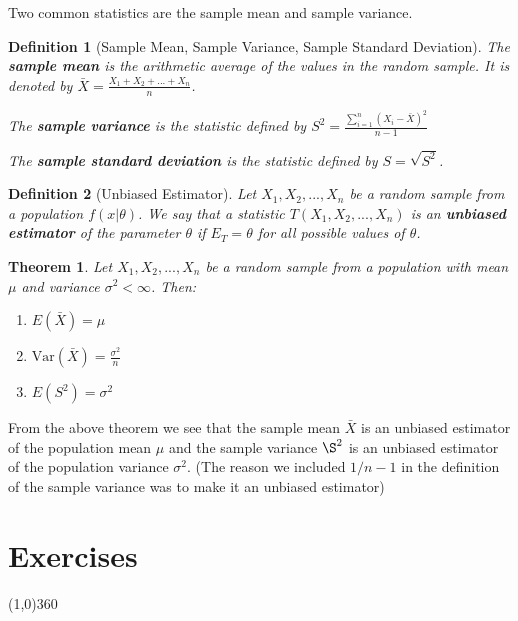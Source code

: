 \documentclass[12pt,twoside]{report}
\newtheorem{defn}{Definition}
\newtheorem{thm}[subsection]{Theorem}
\begin{document}
Two common statistics are the sample mean and sample variance.

\begin{defn}[Sample Mean, Sample Variance, Sample Standard Deviation]
    The \textbf{sample mean} is the arithmetic average of the values in the random sample. It is denoted by $\bar{X} = \displaystyle \frac{X_1 + X_2 + ... + X_n}{n}$.

    The \textbf{sample variance} is the statistic defined by $S^2 = \displaystyle \frac{\sum_{i=1}^n \left (X_i - \bar{X}\right )^2}{n-1}$

    The \textbf{sample standard deviation} is the statistic defined by $S = \sqrt{S^2}$.
\end{defn}

\begin{defn}[Unbiased Estimator]
    Let $X_1, X_2, ..., X_n$ be a random sample from a population $f\left (x| \theta\right )$. We say that a statistic $T\left (X_1, X_2, ...,X_n\right )$ is an \textbf{unbiased estimator} of the parameter $\theta$ if $E_T = \theta$ for all possible values of $\theta$.
\end{defn}

\begin{thm}
    Let $X_1, X_2, ..., X_n$ be a random sample from a population with mean $\mu $ and variance $\sigma ^2 < \infty$. Then:
    \begin{enumerate}
        \item $E\left (\bar{X}\right ) = \mu $
        \item $\text{Var}\left (\bar{X}\right ) = \frac{\sigma ^2}{n}$
        \item $E\left (S ^2\right ) = \sigma ^2$
    \end{enumerate}
\end{thm}

From the above theorem we see that the sample mean $\bar{X}$ is an unbiased estimator of the population mean $\mu$ and the sample variance $\S^2$ is an unbiased estimator of the population variance $\sigma^2$. (The reason we included $1/n-1$ in the  definition of the sample variance was to make it an unbiased estimator)



\newpage
\chapter{Exercises}
\line(1,0){360} \\
\end{document}
